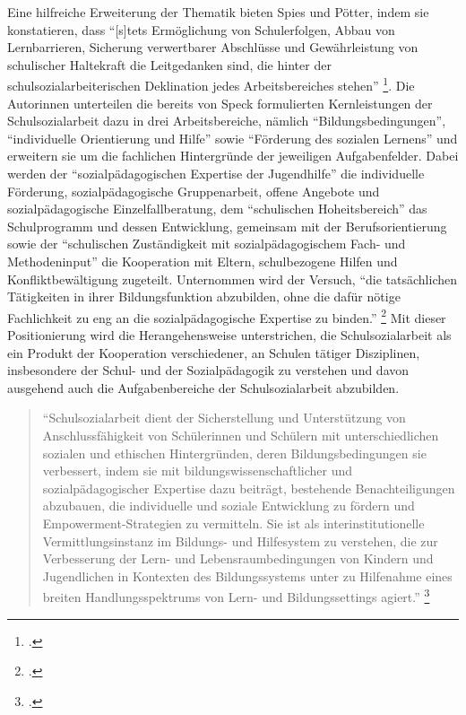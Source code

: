 \noindent
Eine hilfreiche Erweiterung der Thematik bieten Spies und Pötter, indem sie konstatieren, dass "`[s]tets Ermöglichung von Schulerfolgen, Abbau von Lernbarrieren, Sicherung verwertbarer Abschlüsse und Gewährleistung von schulischer Haltekraft die Leitgedanken sind, die hinter der schulsozialarbeiterischen Deklination jedes Arbeitsbereiches stehen"' \footcite[93]{Spies2011}. Die Autorinnen unterteilen die bereits von Speck formulierten Kernleistungen der Schulsozialarbeit dazu in drei Arbeitsbereiche, nämlich "`Bildungsbedingungen"', "`individuelle Orientierung und Hilfe"' sowie "`Förderung des sozialen Lernens"' und erweitern sie um die fachlichen Hintergründe der jeweiligen Aufgabenfelder. Dabei werden der "`sozialpädagogischen Expertise der Jugendhilfe"' die individuelle Förderung, sozialpädagogische Gruppenarbeit, offene Angebote und sozialpädagogische Einzelfallberatung, dem "`schulischen Hoheitsbereich"' das  Schulprogramm und dessen Entwicklung, gemeinsam mit der Berufsorientierung sowie der "`schulischen Zuständigkeit mit sozialpädagogischem Fach- und Methodeninput"' die Kooperation mit Eltern, schulbezogene Hilfen und Konfliktbewältigung zugeteilt. Unternommen wird der Versuch, "`die tatsächlichen Tätigkeiten in ihrer Bildungsfunktion abzubilden, ohne die dafür nötige Fachlichkeit zu eng an die sozialpädagogische Expertise zu binden."' \footcite[91]{Spies2011} Mit dieser Positionierung wird die Herangehensweise unterstrichen, die Schulsozialarbeit als ein Produkt der Kooperation verschiedener, an Schulen tätiger Disziplinen, insbesondere der Schul- und der Sozialpädagogik zu verstehen und davon ausgehend auch die Aufgabenbereiche der Schulsozialarbeit abzubilden.

\begin{quotation}
\noindent
"`Schulsozialarbeit dient der Sicherstellung und Unterstützung von Anschlussfähigkeit von Schülerinnen und Schülern mit unterschiedlichen sozialen und ethischen Hintergründen, deren Bildungsbedingungen sie verbessert, indem sie mit bildungswissenschaftlicher und sozialpädagogischer Expertise dazu beiträgt, bestehende Benachteiligungen abzubauen, die individuelle und soziale Entwicklung zu fördern und Empowerment-Strategien zu vermitteln. Sie ist als interinstitutionelle Vermittlungsinstanz im Bildungs- und Hilfesystem zu verstehen, die zur Verbesserung der Lern- und Lebensraumbedingungen von Kindern und Jugendlichen in Kontexten des Bildungssystems unter zu Hilfenahme eines breiten Handlungsspektrums von Lern- und Bildungssettings agiert."' \footcite[92]{Spies2011}
\end{quotation}

